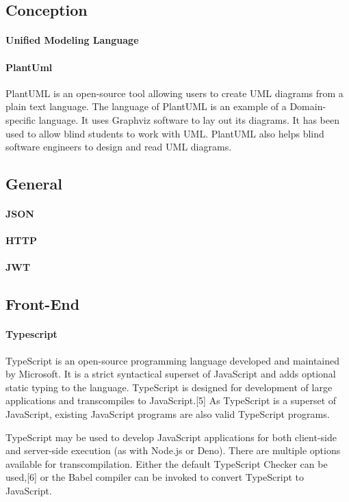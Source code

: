 \subsection{Conception}
\paragraph{Unified Modeling Language}
\paragraph{PlantUml}
PlantUML is an open-source tool allowing users to create UML diagrams from a plain text language. The language of PlantUML is an example of a Domain-specific language. It uses Graphviz software to lay out its diagrams. It has been used to allow blind students to work with UML. PlantUML also helps blind software engineers to design and read UML diagrams.

\subsection{General}
\paragraph{JSON}
\paragraph{HTTP}
\paragraph{JWT}

\subsection{Front-End}
\paragraph{Typescript}
TypeScript is an open-source programming language developed and maintained by Microsoft. It is a strict syntactical superset of JavaScript and adds optional static typing to the language. TypeScript is designed for development of large applications and transcompiles to JavaScript.[5] As TypeScript is a superset of JavaScript, existing JavaScript programs are also valid TypeScript programs.

TypeScript may be used to develop JavaScript applications for both client-side and server-side execution (as with Node.js or Deno). There are multiple options available for transcompilation. Either the default TypeScript Checker can be used,[6] or the Babel compiler can be invoked to convert TypeScript to JavaScript.

